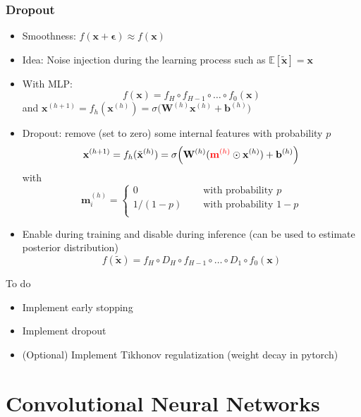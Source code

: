 \documentclass[pressentation,10pt,aspectratio=169,xcolor=table, colorlinks=true]{beamer}
\begin{document}
\begin{frame}
  \frametitle{Dropout}
  \begin{itemize}
  \item Smoothness: \(f(\mathbf{x}+\boldsymbol{\epsilon}) \approx f(\mathbf{x}) \)
  \item Idea: Noise injection during the learning process such as \(\mathbb{E}[\tilde{\mathbf{x}}] = \mathbf{x}\)
  \item With MLP:
    \[f(\mathbf{x}) = f_H\circ f_{H-1}\circ \ldots \circ f_0(\mathbf{x})\]
    and \(\mathbf{x}^{(h+1)} = f_h(\mathbf{x}^{(h)})=\sigma\Big(\mathbf{W}^{(h)}\mathbf{x}^{(h)} + \mathbf{b}^{(h)}\Big)\)
  \item Dropout: remove (set to zero) some internal features with probability \(p\)
    \[\mathbf{x}^{(h+1)} = f_h(\tilde{\mathbf{x}}^{(h)})=\sigma\Big(\mathbf{W}^{(h)}(\textcolor{red}{\mathbf{m}^{(h)}}\odot\mathbf{x}^{(h)}) + \mathbf{b}^{(h)}\Big)\]
    with \[\mathbf{m}^{(h)}_i =
      \begin{cases}
        0 & \quad \text{ with probability } p\\
        1/(1-p) & \quad \text{ with probability } 1-p\\
      \end{cases}
    \]
  \item<2> Enable during training and disable during inference (can be used to estimate posterior distribution)
    {\color{blue} \[f(\tilde{\mathbf{x}}) = f_H\circ D_H\circ f_{H-1}\circ \ldots \circ D_1\circ f_0(\mathbf{x})\] }
  \end{itemize}
\end{frame}

\begin{frame}{To do}
  \begin{work}
    \begin{itemize}
    \item Implement early stopping
    \item Implement dropout
    \item (Optional) Implement Tikhonov regulatization (weight decay in pytorch)
    \end{itemize}
  \end{work}
\end{frame}


\section{Convolutional Neural Networks}
\end{document}
